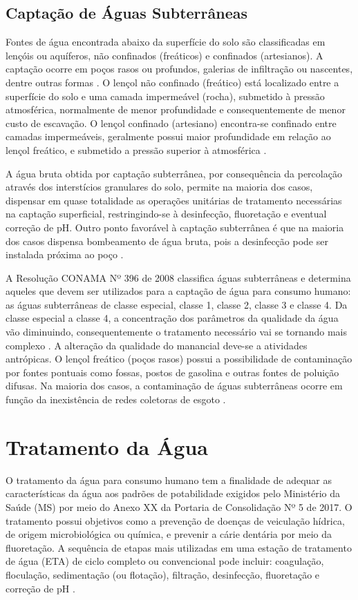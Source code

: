 \subsection{Captação de Águas Subterrâneas}

Fontes de água encontrada abaixo da superfície do solo são classificadas em lençóis ou aquíferos, não confinados (freáticos) e confinados (artesianos). A captação ocorre em poços rasos ou profundos, galerias de infiltração ou nascentes, dentre outras formas \cite{brasilb}. O lençol não confinado (freático) está localizado entre a superfície do solo e uma camada impermeável (rocha), submetido à pressão atmosférica, normalmente de menor profundidade e consequentemente de menor custo de escavação. O lençol confinado (artesiano) encontra-se confinado entre camadas impermeáveis,  geralmente possui maior profundidade em relação ao lençol freático, e submetido a pressão superior à atmosférica  \cite{brasila}.

A água bruta obtida por captação subterrânea, por consequência da percolação através dos interstícios granulares do solo, permite na maioria dos casos, dispensar em quase totalidade as operações unitárias de tratamento necessárias na captação superficial, restringindo-se à desinfecção, fluoretação e eventual correção de pH. Outro ponto favorável à captação subterrânea é que na maioria dos casos dispensa bombeamento de água bruta, pois a desinfecção pode ser instalada próxima ao poço \cite{brasila}.

A Resolução CONAMA Nº 396 de 2008  classifica águas subterrâneas e determina aqueles que devem ser utilizados para a captação de água para consumo humano: as águas subterrâneas de classe especial, classe 1, classe 2, classe 3 e classe 4. Da classe especial a classe 4, a concentração dos parâmetros da qualidade da água vão diminuindo, consequentemente o tratamento necessário vai se tornando mais complexo \cite{conama396}. A alteração da qualidade do manancial deve-se a atividades antrópicas. O lençol freático (poços rasos) possui a possibilidade de contaminação por fontes pontuais como fossas, postos de gasolina e outras fontes de poluição difusas. Na maioria dos casos, a contaminação de águas subterrâneas ocorre em função da inexistência de redes coletoras de esgoto \cite{brasila}.


\section{Tratamento da Água}
O tratamento da água para consumo humano tem a finalidade de adequar as características da água aos padrões de potabilidade exigidos pelo Ministério da Saúde (MS) por meio do Anexo XX da Portaria de Consolidação Nº 5 de 2017. O tratamento possui objetivos como a prevenção de doenças de veiculação hídrica, de origem microbiológica ou química, e prevenir a cárie dentária por meio da fluoretação. A sequência de etapas mais utilizadas em uma estação de tratamento de água (ETA) de ciclo completo ou convencional pode incluir: coagulação, floculação, sedimentação (ou flotação), filtração, desinfecção, fluoretação e correção de pH \cite{brasilb}. 

